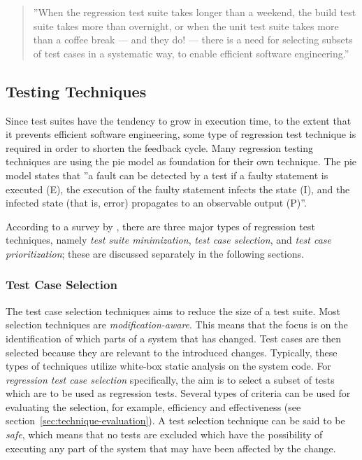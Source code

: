 \documentclass[a4paper,english,12pt]{report}
\begin{document}
\begin{quote}
''When the regression test suite takes longer than a weekend, the build test suite takes more than overnight, or when the unit test suite takes more than a coffee break — and they do! — there is a need for selecting subsets of test cases in a systematic way, to enable efficient software engineering.''
\end{quote}

\subsection{Testing Techniques}\label{sec:regression-testing-techniques}
Since test suites have the tendency to grow in execution time, to the extent that it prevents efficient software engineering, some type of regression test technique is required in order to shorten the feedback cycle. \citep[p. 245]{runeson2012regression} Many regression testing techniques are using the \gls{pie} model as foundation for their own technique. The \gls{pie} model states that ''a fault can be detected by a test if a faulty statement is executed (E), the execution of the faulty statement infects the state (I), and the infected state (that is, error) propagates to an observable output (P)''. \citep{voas1992pie}

According to a survey by \citet[p. 68]{yoo2012regression}, there are three major types of regression test techniques, namely \textit{test suite minimization}, \textit{test case selection}, and \textit{test case prioritization}; these are discussed separately in the following sections.

\subsubsection{Test Case Selection}
The test case selection techniques aims to reduce the size of a test suite. Most selection techniques are \textit{modification-aware}. This means that the focus is on the identification of which parts of a system that has changed. Test cases are then selected because they are relevant to the introduced changes. Typically, these types of techniques utilize white-box static analysis on the system code. \citep[p. 70]{yoo2012regression} For \textit{regression test case selection} specifically, the aim is to select a subset of tests which are to be used as regression tests. Several types of criteria can be used for evaluating the selection, for example, efficiency and effectiveness (see section~\vref{sec:technique-evaluation}). A test selection technique can be said to be \textit{safe}, which means that no tests are excluded which have the possibility of executing any part of the system that may have been affected by the change. \citep{runeson2012regression}
\end{document}
